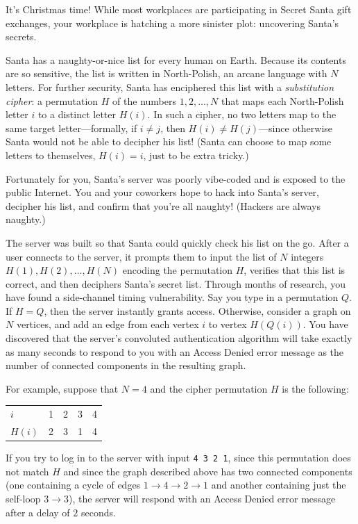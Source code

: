 




It's Christmas time! While most workplaces are participating in Secret Santa gift exchanges, your workplace is hatching a more sinister plot: uncovering Santa's secrets.

Santa has a naughty-or-nice list for every human on Earth. Because its contents are so sensitive, the list is written in North-Polish, an arcane language with $N$ letters. For further security, Santa has enciphered this list with a \emph{substitution cipher}: a permutation $H$ of the numbers $1, 2, \ldots, N$ that maps each North-Polish letter $i$ to a distinct letter $H(i)$. In such a cipher, no two letters map to the same target letter---formally, if $i\neq j$, then $H(i) \neq H(j)$---since otherwise Santa would not be able to decipher his list! (Santa can choose to map some letters to themselves, $H(i) = i$, just to be extra tricky.)

Fortunately for you, Santa's server was poorly vibe-coded and is exposed to the public Internet. You and your coworkers hope to hack into Santa's server, decipher his list, and confirm that you're all naughty! (Hackers are always naughty.)

The server was built so that Santa could quickly check his list on the go. After a user connects to the server, it prompts them to input the list of $N$ integers $H(1), H(2), \ldots, H(N)$ encoding the permutation $H$, verifies that this list is correct, and then deciphers Santa's secret list.
Through months of research, you have found a side-channel timing vulnerability. Say you type in a permutation $Q$. If $H=Q$, then the server instantly grants access. Otherwise, consider a graph on $N$ vertices, and add an edge from each vertex $i$ to vertex $H(Q(i))$. You have discovered that the server's convoluted authentication algorithm will take exactly as many seconds to respond to you with an Access Denied error message as the number of connected components in the resulting graph.

For example, suppose that $N=4$ and the cipher permutation $H$ is the following:
\begin{center}
  \begin{tabular}{l|cccc}
    $i$ & 1 & 2 & 3 & 4\\
    $H(i)$ & 2 & 3 & 1 & 4
  \end{tabular}
\end{center}
If you try to log in to the server with input \texttt{4 3 2 1}, since this permutation does not match $H$ and since the graph described above has two connected components (one containing a cycle of edges $1 \to 4 \to 2 \to 1$ and another containing just the self-loop $3 \to 3$), the server will respond with an Access Denied error message after a delay of $2$ seconds.

